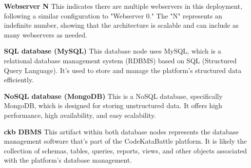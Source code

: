\noindent\textbf{Webserver N}\newline
This indicates there are multiple webservers in this deployment, following a similar configuration to "Webserver 0." 
The "N" represents an indefinite number, showing that the architecture is scalable and can include as many webservers as needed.

\noindent\textbf{SQL database (MySQL)}\newline
This database node uses MySQL, which is a relational database management system (RDBMS) based on SQL (Structured Query Language). 
It's used to store and manage the platform's structured data efficiently.

\noindent\textbf{NoSQL database (MongoDB)}\newline
This is a NoSQL database, specifically MongoDB, which is designed for storing unstructured data. It offers high performance, high availability, and easy scalability.

\noindent\textbf{ckb DBMS}\newline
This artifact within both database nodes represents the database management software that's part of the CodeKataBattle platform. It is likely the collection of schemas, 
tables, queries, reports, views, and other objects associated with the platform's database management.